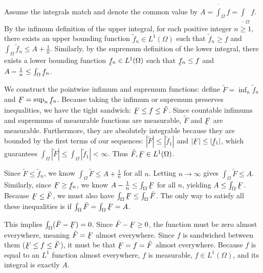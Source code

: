 \begin{pfbox}
    Assume the integrals match and denote the common value by $A = \overline{\int}_\Omega f = \underline{\int}_\Omega f$.
    By the infimum definition of the upper integral, for each positive integer $n \ge 1$, there exists an upper bounding function $\tilde{f}_n \in L^1(\Omega)$ such that $\tilde{f}_n \ge f$ and $\int_\Omega \tilde{f}_n \le A + \frac{1}{n}$.
    Similarly, by the supremum definition of the lower integral, there exists a lower bounding function $\underaccent{\tilde}{f}_n \in L^1(\Omega)$ such that $\underaccent{\tilde}{f}_n \le f$ and $A - \frac{1}{n} \le \int_\Omega \underaccent{\tilde}{f}_n$.
    
    We construct the pointwise infimum and supremum functions: define $\tilde{F} = \inf_n \tilde{f}_n$ and $\underaccent{\tilde}{F} = \sup_n \underaccent{\tilde}{f}_n$.
    Because taking the infimum or supremum preserves inequalities, we have the tight sandwich: $\underaccent{\tilde}{F} \le f \le \tilde{F}$. Since countable infimums and supremums of measurable functions are measurable, $\tilde{F}$ and $\underaccent{\tilde}{F}$ are measurable.
    Furthermore, they are absolutely integrable because they are bounded by the first terms of our sequences: $|\tilde{F}| \le |\tilde{f}_1|$ and $|\underaccent{\tilde}{F}| \le |\underaccent{\tilde}{f}_1|$, which guarantees $\int_\Omega |\tilde{F}| \le \int_\Omega |\tilde{f}_1| < \infty$. Thus $\tilde{F}, \underaccent{\tilde}{F} \in L^1(\Omega)$.
    
    Since $\tilde{F} \le \tilde{f}_n$, we know $\int_\Omega \tilde{F} \le A + \frac{1}{n}$ for all $n$. Letting $n \to \infty$ gives $\int_\Omega \tilde{F} \le A$.
    Similarly, since $\underaccent{\tilde}{F} \ge \underaccent{\tilde}{f}_n$, we know $A - \frac{1}{n} \le \int_\Omega \underaccent{\tilde}{F}$ for all $n$, yielding $A \le \int_\Omega \underaccent{\tilde}{F}$.
    Because $\underaccent{\tilde}{F} \le \tilde{F}$, we must also have $\int_\Omega \underaccent{\tilde}{F} \le \int_\Omega \tilde{F}$. The only way to satisfy all these inequalities is if $\int_\Omega \tilde{F} = \int_\Omega \underaccent{\tilde}{F} = A$.
    
    This implies $\int_\Omega (\tilde{F} - \underaccent{\tilde}{F}) = 0$. Since $\tilde{F} - \underaccent{\tilde}{F} \ge 0$, the function must be zero almost everywhere, meaning $\tilde{F} = \underaccent{\tilde}{F}$ almost everywhere.
    Since $f$ is sandwiched between them ($\underaccent{\tilde}{F} \le f \le \tilde{F}$), it must be that $\underaccent{\tilde}{F} = f = \tilde{F}$ almost everywhere.
    Because $f$ is equal to an $L^1$ function almost everywhere, $f$ is measurable, $f \in L^1(\Omega)$, and its integral is exactly $A$.
\end{pfbox}


